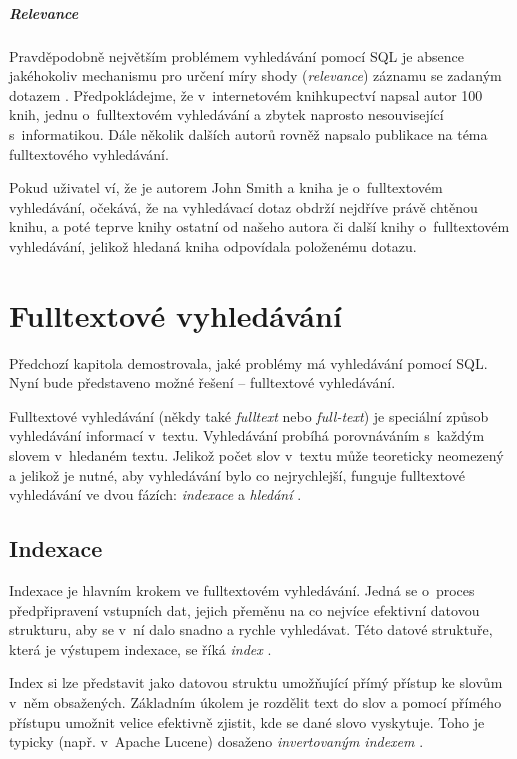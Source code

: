 \documentclass[11pt,oneside]{fithesis2}
\begin{document}
\subparagraph{Relevance}
Pravděpodobně největším problémem vyhledávání pomocí SQL je absence jakéhokoliv mechanismu pro určení míry shody (\emph{relevance}) záznamu se zadaným dotazem \cite[s.~10]{HibernateSearchAction}. Předpokládejme, že v~internetovém knihkupectví napsal autor  100 knih, jednu o~fulltextovém vyhledávání a zbytek naprosto nesouvisející s~informatikou. Dále několik dalších autorů rovněž napsalo publikace na téma fulltextového vyhledávání.

Pokud uživatel ví, že je autorem John Smith a kniha je o~fulltextovém vyhledávání, očekává, že na vyhledávací dotaz  obdrží nejdříve právě chtěnou knihu, a poté teprve knihy ostatní od našeho autora či
další knihy o~fulltextovém vyhledávání, jelikož hledaná kniha  odpovídala položenému dotazu.

\section{Fulltextové vyhledávání}
Předchozí kapitola demostrovala, jaké problémy má vyhledávání pomocí SQL. Nyní bude představeno možné řešení -- fulltextové vyhledávání. 

\label{UvodDoFulltextu}
Fulltextové vyhledávání (někdy také \emph{fulltext} nebo \emph{full-text}) je speciální způsob vyhledávání informací v~textu. Vyhledávání probíhá porovnáváním s~každým slovem v~hledaném textu. Jelikož počet slov v~textu může teoreticky neomezený a jelikož je 
nutné, aby vyhledávání bylo co nejrychlejší, funguje fulltextové vyhledávání ve dvou fázích: \emph{indexace} a \emph{hledání} \cite[s.~11]{HibernateSearchAction}. 

\subsection{Indexace}
Indexace je hlavním krokem ve fulltextovém vyhledávání. Jedná se o~proces předpřipravení vstupních dat, jejich přeměnu na co nejvíce efektivní datovou strukturu, aby se v~ní dalo snadno a rychle vyhledávat. Této datové struktuře, která je výstupem indexace, se říká \emph{index} \cite[s.~11]{LuceneAction}. 

Index si lze představit jako datovou struktu umožňující přímý přístup ke slovům v~něm obsažených. Základním úkolem je rozdělit text do slov a pomocí přímého přístupu umožnit velice efektivně zjistit, kde se dané slovo vyskytuje. Toho je typicky (např. v~Apache Lucene) dosaženo \emph{invertovaným indexem} \cite[s.~35]{LuceneAction}. %
\end{document}

